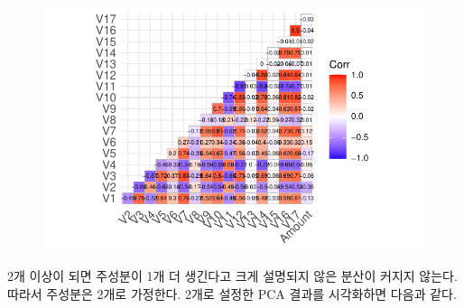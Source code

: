 \documentclass[
  letterpaper,
  DIV=11,
  numbers=noendperiod]{scrreprt}
\begin{document}
\begin{figure}[H]

{\centering \includegraphics{./test_27_files/figure-pdf/unnamed-chunk-5-1.pdf}

}

\end{figure}

2개 이상이 되면 주성분이 1개 더 생긴다고 크게 설명되지 않은 분산이
커지지 않는다. 따라서 주성분은 2개로 가정한다. 2개로 설정한 PCA 결과를
시각화하면 다음과 같다.
\end{document}
